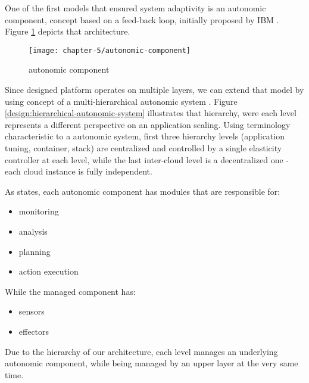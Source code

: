 One of the first models that ensured system adaptivity is an autonomic component, concept based on a feed-back loop, initially proposed by IBM \cite{IBM06}. Figure \ref{design:autonomic-component} depicts that architecture. 

\begin{figure}[!ht]
  \begin{center}
    \texttt{[image: chapter-5/autonomic-component]}
  \end{center}
  \caption{autonomic component}
  \label{design:autonomic-component}
\end{figure}

Since designed platform operates on multiple layers, we can extend that model by using concept of a multi-hierarchical autonomic system \cite{LiWoZh05}. Figure \ref{design:hierarchical-autonomic-system} illustrates that hierarchy, were each level represents a different perspective on an application scaling. Using terminology characteristic to a autonomic system, first three hierarchy levels (application tuning, container, stack) are centralized and controlled by a single elasticity controller at each level, while the last inter-cloud level is a decentralized one - each cloud instance is fully independent.

As \cite{IBM06} states, each autonomic component has modules that are responsible for:
\begin{itemize}
	\item monitoring
	\item analysis
	\item planning
	\item action execution
\end{itemize}

While the managed component has:
\begin{itemize}
	\item sensors
	\item effectors
\end{itemize}

Due to the hierarchy of our architecture, each level manages an underlying autonomic component, while being managed by an upper layer at the very same time.
